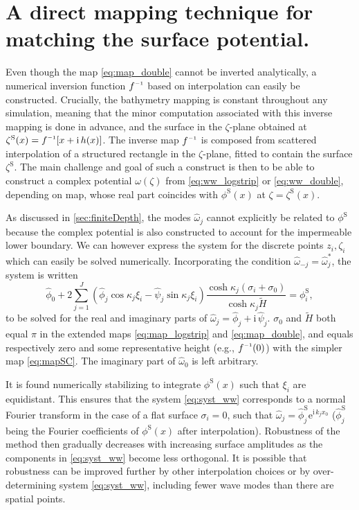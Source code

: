 \documentclass[a4paper,12pt]{article}
\newcommand{\mr}{\mathrm}
\renewcommand{\S}{^\mr{S}}
\newcommand{\ii}{\mr{i}\,}
\newcommand{\ee}{\mr{e}}
\renewcommand{\_}[1]{_\mr{#1}}
\let\Re\relax
\let\Im\relax
\DeclareMathOperator\Re{Re}
\DeclareMathOperator\Im{Im}
\newcommand{\h}{\hat}
\newcommand{\z}{z}
\newcommand{\x}{x}
\newcommand{\zz}{\zeta}
\newcommand{\xx}{\xi}
\newcommand{\yy}{\sigma}
\newcommand{\kk}{\kappa}
\newcommand{\zmap}{f}
\newcommand{\zzmap}{\zmap^{\raisebox{.2ex}{$\scriptscriptstyle-1$}}}
\newcommand{\ww}{\omega}
\begin{document}
\section{A direct mapping technique for matching the surface potential.}
\label{sec:directMapping}
Even though the map \eqref{eq:map_double} cannot be inverted analytically, a numerical inversion function $\zzmap$ based on interpolation can easily be constructed. 
Crucially, the bathymetry mapping is constant throughout any simulation, meaning that the minor computation associated with this inverse mapping is done in advance, 
and the surface in the $\zz$-plane obtained at $\zz\S(\x)=\zzmap[\x+\ii h(\x)]$.
The inverse map $\zzmap$ is composed from scattered interpolation of a structured rectangle in the $\zz$-plane, fitted to contain the surface $\zz\S$.
The main challenge and goal of such a construct is then to be able to construct a complex potential $\ww(\zz)$ from \eqref{eq:ww_logstrip} or \eqref{eq:ww_double}, depending on map, whose real part coincides with $\phi\S(\x)$ at $\zz=\zz\S(\x)$.

As discussed in \autoref{sec:finiteDepth}, the modes $\h\ww_j$ cannot explicitly be related to $\phi\S$ because the complex potential is also constructed to account for the impermeable lower boundary. 
We can however express the system for the discrete points $\z_i,\zz_i$ which can easily be solved numerically.
Incorporating the condition $\h\ww_{-j}=\h\ww_{j}^*$, the system is written
\begin{equation}
\h\phi_0 + 2\sum_{j=1}^J (\h\phi_j \cos\kk_j \xx_i - \h\psi_j \sin\kk_j \xx_i )\frac{\cosh \kk_j(\yy_i+\yy_0)}{\cosh\kk_j\tilde H} = \phi\S_i,
\label{eq:syst_ww}
\end{equation}
to be solved for the real and imaginary parts of 
$\h\ww_j = \h\phi_j + \ii \h\psi_j$. 
$\yy_0$ and $\tilde H$ both equal $\pi$ in the extended maps \eqref{eq:map_logstrip} and \eqref{eq:map_double}, and equals respectively zero and some representative height (e.g., $\Im \zzmap(0)$) with the simpler map \eqref{eq:mapSC}.
The imaginary part of $\h\ww_0$ is left arbitrary.

It is found numerically stabilizing to integrate $\phi\S(x)$ such that $\xx_i$ are equidistant.  
This ensures that the system \eqref{eq:syst_ww} corresponds to a normal Fourier transform in the case of a flat surface $\yy_i=0$, such that $\h\ww_j = \h\phi_j\S \ee^{\ii k_j \x_0}$ ($\h\phi_j\S$ being the Fourier coefficients of $\phi\S(\x)$ after interpolation).
Robustness of the method then gradually decreases with increasing surface amplitudes as the components in \eqref{eq:syst_ww} become less orthogonal.
It is possible that robustness can be improved further by other interpolation choices or by over-determining system \eqref{eq:syst_ww}, including fewer wave modes than there are spatial points.
\\
\end{document}
